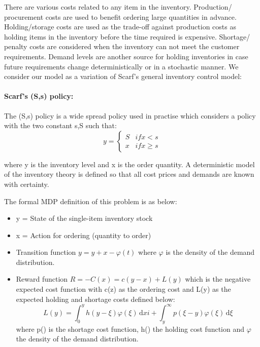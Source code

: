 There are various costs related to any item in the inventory. Production/ procurement costs are used to benefit ordering large quantities in advance. Holding/storage costs are used as the trade-off against production costs as holding items in the inventory before the time required is expensive. Shortage/ penalty costs are considered when the inventory can not meet the customer requirements. Demand levels are another source for holding inventories in case future requirements change deterministically or in a stochastic manner. 
We consider our model as a variation of Scarf's general inventory control model:
 
\paragraph*{Scarf's (S,s) policy:}
The (S,s) policy is a wide spread policy used in practise which considers a policy with the two constant s,S such that: 
\[y = \begin{cases}
S & if x<s \\
x & if x \geq s
\end{cases}\]

where y is the inventory level and x is the order quantity.  A deterministic model of the inventory theory is defined so that all cost prices and demands are known with certainty. 

The formal MDP definition of this problem is as below:
\begin{itemize}
\item y = State of the single-item inventory stock
\item x = Action for ordering (quantity to order) 
\item Transition function $y = y + x - \varphi(t) $ where $\varphi$ is the density of the demand distribution.
\item Reward function $R = -C(x) = c(y-x)+L(y)$ which is the negative expected cost function with c(z) as the ordering cost and L(y) as the expected holding and shortage costs defined below: 
\[ 
L(y) =\int_0^y \! h(y-\xi)\varphi(\xi) \, \mathrm{d} xi + \int_y^{\infty} \! p(\xi - y)\varphi(\xi) \, \mathrm{d} \xi 
\]
where p() is the shortage cost function, h() the holding cost function and $\varphi$ the density of the demand distribution. 
\end{itemize}


